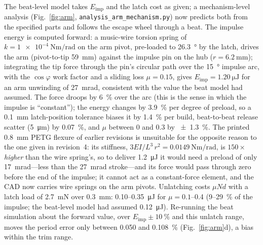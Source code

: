 \documentclass[11pt,a4paper]{article}
\begin{document}
The beat-level model takes $E_{\mathrm{imp}}$ and the latch cost as given; a mechanism-level analysis (Fig.~\ref{fig:arm}, \texttt{analysis\_arm\_mechanism.py}) now predicts both from the specified parts and follows the escape wheel through a beat. The impulse energy is computed forward: a music-wire torsion spring of $k = \SI{1e-4}{\newton\metre\per\radian}$ on the arm pivot, pre-loaded to \SI{26.3}{\degree} by the latch, drives the arm (pivot-to-tip \SI{59}{\milli\metre}) against the impulse pin on the hub ($r = \SI{6.2}{\milli\metre}$); integrating the tip force through the pin's circular path over the \SI{15}{\degree} impulse arc, with the $\cos\varphi$ work factor and a sliding loss $\mu = 0.15$, gives $E_{\mathrm{imp}} = \SI{1.20}{\micro\joule}$ for an arm unwinding of \SI{27}{\milli\radian}, consistent with the value the beat model had assumed. The force droops by \SI{6}{\percent} over the arc (this is the sense in which the impulse is ``constant''); the energy changes by \SI{3.9}{\percent} per degree of preload, so a \SI{0.1}{\milli\metre} latch-position tolerance biases it by \SI{1.4}{\percent} per build, beat-to-beat release scatter (\SI{5}{\micro\metre}) by \SI{0.07}{\percent}, and $\mu$ between 0 and 0.3 by \SI{\pm 1.3}{\percent}. The printed \SI{0.8}{\milli\metre} PETG flexure of earlier revisions is unsuitable for the opposite reason to the one given in revision~4: its stiffness, $3EI/L^3\,r^2 = \SI{0.0149}{\newton\metre\per\radian}$, is $150\times$ \emph{higher} than the wire spring's, so to deliver \SI{1.2}{\micro\joule} it would need a preload of only \SI{17}{\milli\radian}---less than the \SI{27}{\milli\radian} stroke---and its force would pass through zero before the end of the impulse; it cannot act as a constant-force element, and the CAD now carries wire springs on the arm pivots. Unlatching costs $\mu N d$ with a latch load of \SI{2.7}{\milli\newton} over \SI{0.3}{\milli\metre}: 0.10--\SI{0.35}{\micro\joule} for $\mu = 0.1$--0.4 (9--\SI{29}{\percent} of the impulse; the beat-level model had assumed \SI{0.12}{\micro\joule}). Re-running the beat simulation about the forward value, over $E_{\mathrm{imp}} \pm \SI{10}{\percent}$ and this unlatch range, moves the period error only between 0.050 and \SI{0.108}{\percent} (Fig.~\ref{fig:arm}d), a bias within the trim range.
\end{document}
